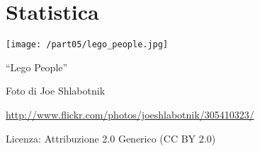 \part{Statistica}
\texttt{[image: /part05/lego\_people.jpg]}
  \begin{center}
    {\large ``Lego People''}\par
    Foto di Joe Shlabotnik\par
    \url{http://www.flickr.com/photos/joeshlabotnik/305410323/}\par
    Licenza: Attribuzione 2.0 Generico (CC BY 2.0)\par
  \end{center}
\clearpage
\cleardoublepage
